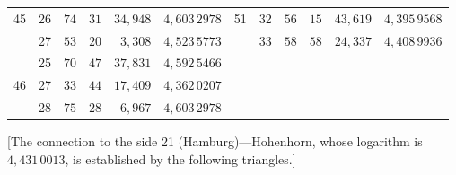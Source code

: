 \begin{center}
\begin{tabular}{|c|c|r@{\;}r@{\;}r|c||c|c|r@{\;}r@{\;}r|c|}
45 & 26 & $74$ & $31$ & $34{,}948$ & $4{,}603\,2978$ & 51 & 32 & $56$ & $15$ & $43{,}619$ & $4{,}395\,9568$\\
 & 27 & $53$ & $20$ & $3{,}308$ & $4{,}523\,5773$ &  & 33 & $58$ & $58$ & $24{,}337$ & $4{,}408\,9936$\\[3pt]
 & 25 & $70$ & $47$ & $37{,}831$ & $4{,}592\,5466$ &  &  &  &  &  & \\
46 & 27 & $33$ & $44$ & $17{,}409$ & $4{,}362\,0207$ &  &  &  &  &  & \\
 & 28 & $75$ & $28$ & $6{,}967$ & $4{,}603\,2978$ &  &  &  &  &  & \\
\end{tabular}\end{center}

[The connection to the side 21 (Hamburg)---Hohenhorn, whose logarithm
is $4{,}431\,0013$, is established by the following triangles.]

